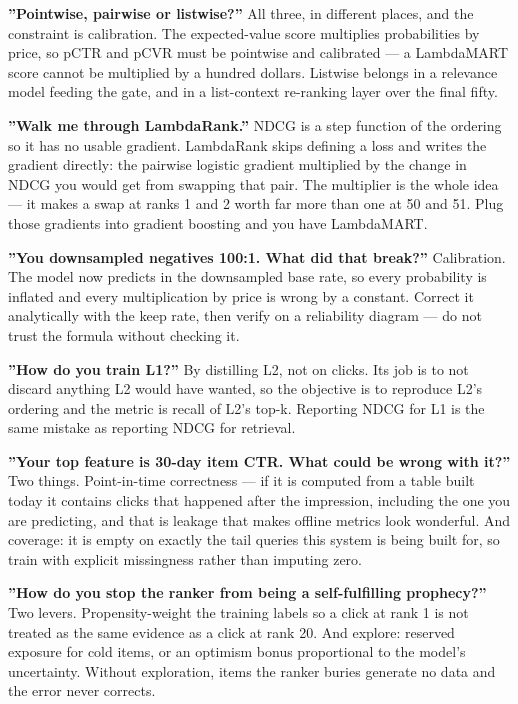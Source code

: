 \documentclass[10pt,twoside]{book}
\newcommand{\csection}[1]{\par\vspace{13pt}\noindent{\sffamily\large\bfseries\color{ink}\raggedright #1\par}\vspace{4pt}}
\begin{document}
\csection{On ranking}
\textbf{''Pointwise, pairwise or listwise?''} All three, in different places, and the constraint is calibration. The expected-value score multiplies probabilities by price, so pCTR and pCVR must be pointwise and calibrated --- a LambdaMART score cannot be multiplied by a hundred dollars. Listwise belongs in a relevance model feeding the gate, and in a list-context re-ranking layer over the final fifty.\par
\textbf{''Walk me through LambdaRank.''} NDCG is a step function of the ordering so it has no usable gradient. LambdaRank skips defining a loss and writes the gradient directly: the pairwise logistic gradient multiplied by the change in NDCG you would get from swapping that pair. The multiplier is the whole idea --- it makes a swap at ranks 1 and 2 worth far more than one at 50 and 51. Plug those gradients into gradient boosting and you have LambdaMART.\par
\textbf{''You downsampled negatives 100:1. What did that break?''} Calibration. The model now predicts in the downsampled base rate, so every probability is inflated and every multiplication by price is wrong by a constant. Correct it analytically with the keep rate, then verify on a reliability diagram --- do not trust the formula without checking it.\par
\textbf{''How do you train L1?''} By distilling L2, not on clicks. Its job is to not discard anything L2 would have wanted, so the objective is to reproduce L2's ordering and the metric is recall of L2's top-k. Reporting NDCG for L1 is the same mistake as reporting NDCG for retrieval.\par
\textbf{''Your top feature is 30-day item CTR. What could be wrong with it?''} Two things. Point-in-time correctness --- if it is computed from a table built today it contains clicks that happened after the impression, including the one you are predicting, and that is leakage that makes offline metrics look wonderful. And coverage: it is empty on exactly the tail queries this system is being built for, so train with explicit missingness rather than imputing zero.\par
\textbf{''How do you stop the ranker from being a self-fulfilling prophecy?''} Two levers. Propensity-weight the training labels so a click at rank 1 is not treated as the same evidence as a click at rank 20. And explore: reserved exposure for cold items, or an optimism bonus proportional to the model's uncertainty. Without exploration, items the ranker buries generate no data and the error never corrects.\par
\end{document}
